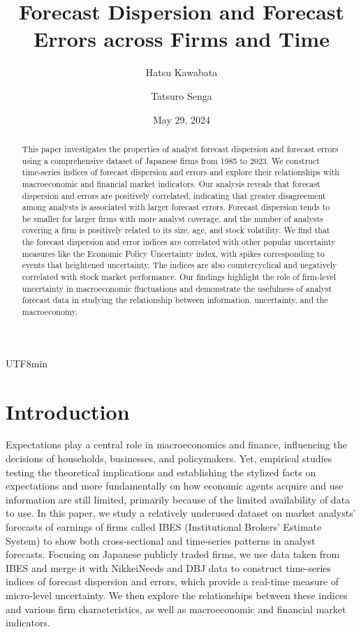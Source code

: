 \documentclass[12pt, a4paper]{article}
\title{Forecast Dispersion and Forecast Errors across Firms and Time}
\author{Hatsu Kawabata \and Tatsuro Senga}
\date{May 29, 2024}
\begin{document}
\begin{CJK}{UTF8}{min}
\maketitle

\begin{abstract}
This paper investigates the properties of analyst forecast dispersion and forecast errors using a comprehensive dataset of Japanese firms from 1985 to 2023. We construct time-series indices of forecast dispersion and errors and explore their relationships with macroeconomic and financial market indicators. Our analysis reveals that forecast dispersion and errors are positively correlated, indicating that greater disagreement among analysts is associated with larger forecast errors. Forecast dispersion tends to be smaller for larger firms with more analyst coverage, and the number of analysts covering a firm is positively related to its size, age, and stock volatility. We find that the forecast dispersion and error indices are correlated with other popular uncertainty measures like the Economic Policy Uncertainty index, with spikes corresponding to events that heightened uncertainty. The indices are also countercyclical and negatively correlated with stock market performance. Our findings highlight the role of firm-level uncertainty in macroeconomic fluctuations and demonstrate the usefulness of analyst forecast data in studying the relationship between information, uncertainty, and the macroeconomy.
\end{abstract}

\section{Introduction}
Expectations play a central role in macroeconomics and finance, influencing the decisions of households, businesses, and policymakers.
Yet, empirical studies testing the theoretical implications and establishing the stylized facts on expectations and more fundamentally
on how economic agents acquire and use information are still limited, primarily because of the limited availability of data to use.
In this paper, we study a relatively underused dataset on market analysts' forecasts of earnings of firms called IBES (Institutional Brokers' Estimate System)
to show both cross-sectional and time-series patterns in analyst forecasts.
Focusing on Japanese publicly traded firms, we use data taken from IBES and merge it with NikkeiNeeds and DBJ data to construct time-series indices
of forecast dispersion and errors, which provide a real-time measure of micro-level uncertainty.
We then explore the relationships between these indices and various firm characteristics, as well as macroeconomic and financial market indicators.


\end{CJK}
\end{document}

